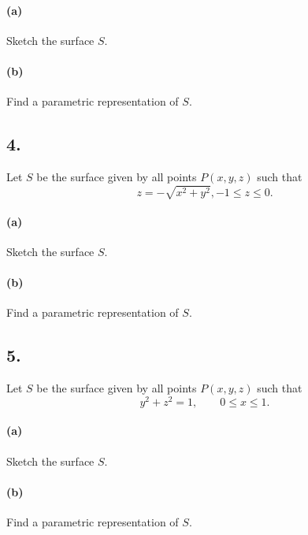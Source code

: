 \paragraph{(a)} Sketch the surface $S$.

\paragraph{(b)} Find a parametric representation of $S$.


\subsection*{4.} Let $S$ be the surface given by all points $P \left( x,y,z \right) $ such that
\[ 
z = - \sqrt{x^2 + y^2}, -1 \leq z \leq 0
.\]

\paragraph{(a)} Sketch the surface $S$.

\paragraph{(b)} Find a parametric representation of $S$.


\subsection*{5.} Let $S$ be the surface given by all points $P(x,y,z)$ such that
\[ 
y^2 + z^2 = 1, \qquad 0 \leq x \leq 1
.\]

\paragraph{(a)} Sketch the surface $S$.

\paragraph{(b)} Find a parametric representation of $S$.


